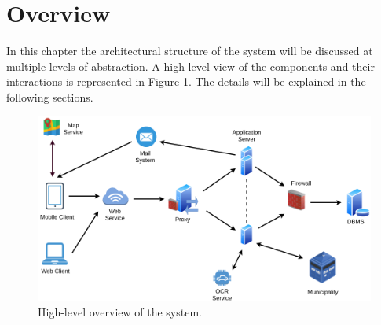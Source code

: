 \documentclass{report}
\begin{document}
\section{Overview}
In this chapter the architectural structure of the system will be discussed at multiple levels of abstraction. A high-level view of the components and their interactions is represented in Figure \ref{fig:overview}. The details will be explained in the following sections.
\begin{figure}[!ht]
	\begin{center}
	\includegraphics[width=\textwidth]{img/HighLevelOverview.png}
    \end{center}
    \label{fig:overview}
	\caption{High-level overview of the system.}
\end{figure}
\newpage
\end{document}
